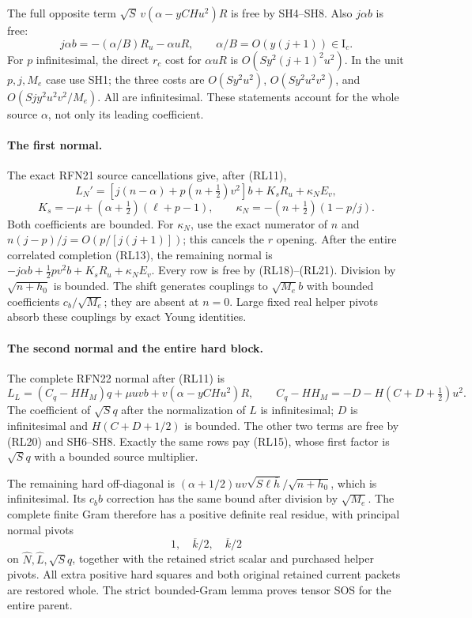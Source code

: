 The full opposite term \(\sqrt S\,v(\alpha-yCHu^2)R\)
is free by SH4--SH8.  Also \(j\alpha b\) is free:
\[
 j\alpha b=-(\alpha/B)R_u-\alpha uR,\qquad
 \alpha/B=O(y(j+1))\in\mathrm I_c.
                                                               \tag{RL21}
\]
For \(p\) infinitesimal, the direct \(r_c\) cost for
\(\alpha uR\) is \(O(Sy^2(j+1)^2u^2)\).
In the unit \(p,j,M_e\) case use SH1; the three costs
are \(O(Sy^2u^2)\), \(O(Sy^2u^2v^2)\), and
\(O(Sjy^2u^2v^2/M_e)\).  All are infinitesimal.
These statements account for the whole source \(\alpha\), not
only its leading coefficient.

\paragraph{The first normal.}
The exact RFN21 source cancellations give, after (RL11),
\[
 L_N'=[j(n-\alpha)+p(n+\tfrac12)v^2]b
             +K_sR_u+\kappa_NE_v,                     \tag{RL22}
\]
\[
 K_s=-\mu+(\alpha+\tfrac12)(\ell+p-1),\qquad
 \kappa_N=-(n+\tfrac12)(1-p/j).
\]
Both coefficients are bounded.  For \(\kappa_N\), use the
exact numerator of \(n\) and
\(n(j-p)/j=O(p/[j(j+1)])\); this cancels the \(r\) opening.
After the entire correlated completion (RL13), the remaining
normal is
\(-j\alpha b+\tfrac12pv^2b+K_sR_u+\kappa_NE_v\).
Every row is free by (RL18)--(RL21).
Division by \(\sqrt{n+h_0}\) is bounded.
The shift generates couplings to \(\sqrt{M_e}b\) with bounded
coefficients \(c_b/\sqrt{M_e}\); they are absent at \(n=0\).
Large fixed real helper pivots absorb these couplings by exact
Young identities.

\paragraph{The second normal and the entire hard block.}
The complete RFN22 normal after (RL11) is
\[
 L_L=(C_q-HH_M)q+\mu uvb+v(\alpha-yCHu^2)R,\qquad
 C_q-HH_M=-D-H(C+D+\tfrac12)u^2 .                      \tag{RL23}
\]
The coefficient of \(\sqrt S q\) after the normalization
of \(L\) is infinitesimal; \(D\) is infinitesimal and
\(H(C+D+1/2)\) is bounded.
The other two terms are free by (RL20) and SH6--SH8.
Exactly the same rows pay (RL15), whose first factor is
\(\sqrt S q\) with a bounded source multiplier.

The remaining hard off-diagonal is
\((\alpha+1/2)uv\sqrt{S\ell\bar h}/\sqrt{n+h_0}\),
which is infinitesimal.  Its \(c_b b\) correction has the
same bound after division by \(\sqrt{M_e}\).
The complete finite Gram therefore has a positive definite
real residue, with principal normal pivots
\[
                   1,\quad\overline k/2,\quad\overline k/2
                                                               \tag{RL24}
\]
on \(\widehat N,\widehat L,\sqrt S q\), together with the
retained strict scalar and purchased helper pivots.
All extra positive hard squares and both original retained
current packets are restored whole.  The strict bounded-Gram
lemma proves tensor SOS for the entire parent.

